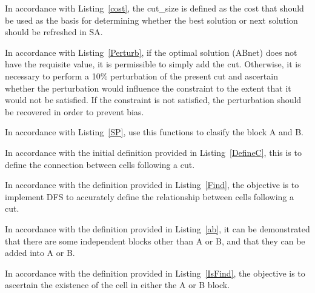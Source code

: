 \documentclass{article}
\begin{document}
In accordance with Listing~\ref{cost}, the cut\_size is defined as the cost that should be used as the basis for determining whether the best solution or next solution should be refreshed in SA.




In accordance with Listing~\ref{Perturb}, if the optimal solution (ABnet) does not have the requisite value, it is permissible to simply add the cut. Otherwise, it is necessary to perform a 10\% perturbation of the present cut and ascertain whether the perturbation would influence the constraint to the extent that it would not be satisfied. If the constraint is not satisfied, the perturbation should be recovered in order to prevent bias. 




In accordance with Listing~\ref{SP}, use this functions to clasify the block A and B.



In accordance with the initial definition provided in Listing~\ref{DefineC}, this is to define the connection between cells following a cut.



In accordance with the definition provided in Listing~\ref{Find}, the objective is to implement DFS to accurately define the relationship between cells following a cut.



In accordance with the definition provided in Listing~\ref{ab}, it can be demonstrated that there are some independent blocks other than A or B, and that they can be added into A or B.



In accordance with the definition provided in Listing~\ref{IsFind}, the objective is to ascertain the existence of the cell in either the A or B block.


\end{document}
